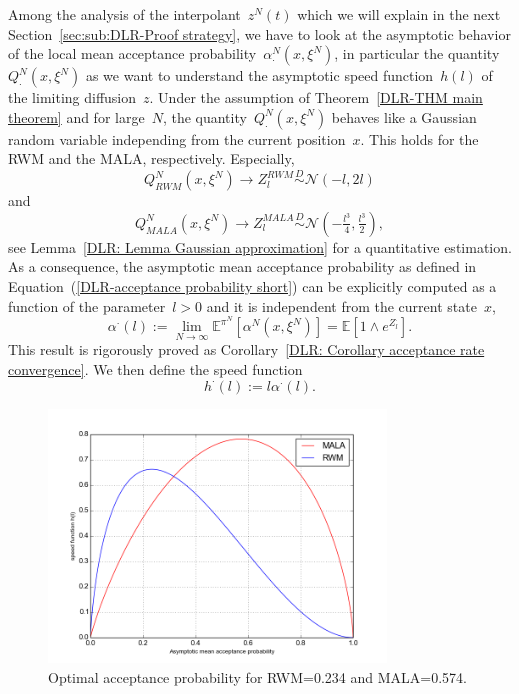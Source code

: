 Among the analysis of the interpolant~$z^N(t)$ which we will explain in the next Section~\ref{sec:sub:DLR-Proof strategy}, we have to look at the asymptotic behavior of the local mean acceptance probability~$\alpha^{N}_{\cdot} (x, \xi^{N})$, in particular the quantity~$Q^{N}_{\cdot}(x, \xi^{N})$ as we want to understand the asymptotic speed function~$h(l)$ of the limiting diffusion~$z$. Under the assumption of Theorem~\ref{DLR-THM main theorem} and for large~$N$, the quantity~$Q^{N}_{\cdot}(x, \xi^{N})$ behaves like a Gaussian random variable independing from the current position~$x$. This holds for the RWM and the MALA, respectively. Especially, 
\begin{equation}
\label{DLR-Gaussian RWM short}
 Q^{N}_{RWM}(x, \xi^{N}) \to Z_l^{RWM} \stackrel{D}{\sim} \mathcal{N}(-l, 2l)
\end{equation}
and
\begin{equation}
\label{DLR-Gaussian MALA short}
 Q^{N}_{MALA}(x, \xi^{N}) \to Z_l^{MALA} \stackrel{D}{\sim} \mathcal{N}(-\tfrac{l^3}{4}, \tfrac{l^3}{2}),
\end{equation}
see Lemma~\ref{DLR: Lemma Gaussian approximation} for a quantitative estimation.  As a consequence, the asymptotic mean acceptance probability as defined in Equation~(\ref{DLR-acceptance probability short}) can be explicitly  computed  as a function of the parameter~$l>0$ and it is independent from the current state~$x$,
\begin{equation}
\label{DLR-asymptotic mean acceptance probability}
 \alpha^{\cdot}(l) := \lim_{N \to \infty}  \mathbb{E}^{\pi^N} \left[ \alpha^N(x, \xi^N) \right] = \mathbb{E} \left[ 1 \wedge e^{Z_l^{\cdot}} \right].
\end{equation}
This result is rigorously proved as Corollary~\ref{DLR: Corollary acceptance rate convergence}. We then define the speed function
\begin{equation}
  \label{DLR: Definition speed function}
 h^{\cdot}(l) := l \alpha^{\cdot}(l).
\end{equation}

\begin{figure}[htb]
 \begin{center} 
  \includegraphics[width=0.8\textwidth]{speedmeasures}
 \end{center}
  \caption{Optimal acceptance probability for RWM=0.234 and MALA=0.574.}
  \label{fig:optimal acceptance probability}
\end{figure}

